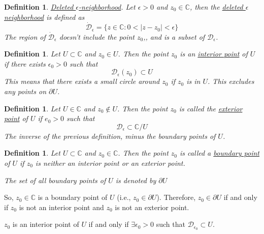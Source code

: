 \documentclass{article}
\newtheorem{definition}[theorem]{Definition}
\newtheorem{one minute paper}[theorem]{One Minute Paper}
\begin{document}
\begin{definition}
    \underline{Deleted $\epsilon$-neighborhood}. Let $\epsilon >0$ and $z_0 \in \mathbb{C}$, then the \underline{deleted $\epsilon$ neighborhood} is defined as 
    \begin{equation}
        \dot{\mathcal{D}}_{\epsilon} = \{z \in \mathbb{C}: 0 < |z - z_0| < \epsilon\}
    \end{equation}
    The region of $\dot{\mathcal{D}}_{\epsilon}$ doesn't include the point $z_0$,, and is a subset of $\mathcal{D}_{\epsilon}$. 
\end{definition}

\begin{definition}
    Let $U \subset \mathbb{C}$ and $z_0 \in U$. Then the point $z_0$ is an \underline{interior point} of $U$ if there exists $\epsilon_0 > 0$ such that 
    \begin{equation}
        \mathcal{D}_{\epsilon}(z_0) \subset U
    \end{equation}
    This means that there exists a small circle around $z_0$ if $z_0$ is in $U$. This excludes any points on $\partial U$. 
\end{definition}

\begin{definition}
    Let $U \in \mathbb{C}$ and $z_0 \notin U$. Then the point $z_0$ is called the \underline{exterior point} of $U$ if $e_0 > 0$ such that 
    \begin{equation}
        \mathcal{D}_{\epsilon} \subset \mathbb{C}/U
    \end{equation}
    The inverse of the previous definition, minus the boundary points of $U$.
\end{definition}

\begin{definition}
    Let $U \subset \mathbb{C}$ and $z_0 \in \mathbb{C}$. Then the point $z_0$ is called a \underline{boundary point} of $U$ if $z_0$ is neither an interior point or an exterior point. 
    \begin{center}
        The set of all boundary points of $U$ is denoted by $\partial U$
    \end{center}
\end{definition}

So, $z_0 \in \mathbb{C}$ is a boundary point of $U$ (i.e., $z_0 \in \partial U$). Therefore, $z_0 \in \partial U$ if and only if $z_0$ is not an interior point and $z_0$ is not an exterior point. 

$z_0$ is an interior point of $U$ if and only if $\exists \epsilon_0 > 0$ such that $\mathcal{D}_{\epsilon_0} \subset U$. 
\end{document}
